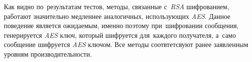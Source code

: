 Как видно по~результатам тестов, методы, связанные с~\textit{RSA} шифрованием, работают значительно медленнее аналогичных, использующих \textit{AES}. Данное поведение является ожидаемым, именно поэтому при~шифровании сообщения, генерируется \textit{AES} ключ, который шифруется для~каждого получателя, а~само сообщение шифруется \textit{AES} ключом. Все методы соотвтетсвуют ранее заявленным уровням производительности.